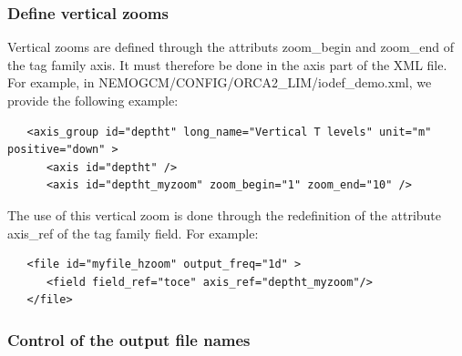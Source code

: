 \subsubsection{Define vertical zooms}
Vertical zooms are defined through the attributs zoom\_begin and zoom\_end of the tag family axis. It must therefore be done in the axis part of the XML file. For example, in NEMOGCM/CONFIG/ORCA2\_LIM/iodef\_demo.xml, we provide the following example:
\vspace{-20pt}
\begin{alltt}  {{\scriptsize
\begin{verbatim}
   <axis_group id="deptht" long_name="Vertical T levels" unit="m" positive="down" >
      <axis id="deptht" />
      <axis id="deptht_myzoom" zoom_begin="1" zoom_end="10" />
\end{verbatim}
}}\end{alltt} 
The use of this vertical zoom is done through the redefinition of the attribute axis\_ref of the tag family field. For example:
\vspace{-20pt}
\begin{alltt}  {{\scriptsize
\begin{verbatim}
   <file id="myfile_hzoom" output_freq="1d" >
      <field field_ref="toce" axis_ref="deptht_myzoom"/>
   </file>
\end{verbatim}
}}\end{alltt} 

\subsubsection{Control of the output file names}

